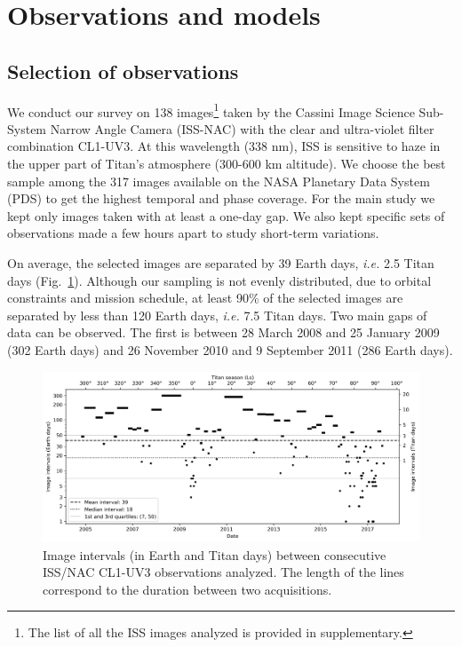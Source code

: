 \section{Observations and models}

\subsection{Selection of observations}
We conduct our survey on 138 images\footnote{The list of all the ISS images analyzed is provided in supplementary.} taken by the Cassini Image Science Sub-System Narrow Angle Camera (ISS-NAC) with the
clear and ultra-violet filter combination CL1-UV3. At this wavelength (338 nm), ISS is sensitive to haze in the
upper part of Titan's atmosphere (300-600 km altitude). We choose the best sample among the 317 images available on the NASA Planetary Data System (PDS)
to get the highest temporal and phase coverage. For the main study we kept only images taken with at least a one-day gap.
We also kept specific sets of observations made a few hours apart to study short-term variations.

On average, the selected images are separated by 39 Earth days, \textit{i.e.} 2.5 Titan days (Fig.~\ref{fig:img_sampling}).
Although our sampling is not evenly distributed, due to orbital constraints and mission schedule, at least 90\% of the selected
images are separated by less than 120 Earth days, \textit{i.e.} 7.5 Titan days. Two main gaps of data can be observed.
The first is between 28 March 2008 and 25 January 2009 (302 Earth days) and 26 November 2010 and 9 September 2011 (286 Earth days).

\begin{figure}[!ht]
    \centering
    \includegraphics[width=\textwidth]{Fig/IMG_interval.png}
    \caption{Image intervals (in Earth and Titan days) between consecutive ISS/NAC CL1-UV3 observations analyzed.
        The length of the lines correspond to the duration between two acquisitions.}
    \label{fig:img_sampling}
\end{figure}

